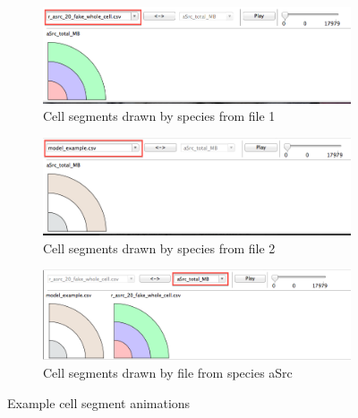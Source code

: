 \begin{figure}[h!]
    \centering
    \begin{subfigure}[b]{0.9\textwidth}
        \centering
        \includegraphics[width=\textwidth]{images/by_file_fake.png}
        \caption{Cell segments drawn by species from file 1}
        \label{fig:cell_seg_file_fake}
    \end{subfigure}

    \begin{subfigure}[b]{0.9\textwidth}
        \centering
        \includegraphics[width=\textwidth]{images/by_file_model.png}
        \caption{Cell segments drawn by species from file 2}
        \label{fig:cell_seg_file_model}
    \end{subfigure}

    \begin{subfigure}[b]{0.9\textwidth}
        \centering
        \includegraphics[width=\textwidth]{images/by_species_asrc.png}
        \caption{Cell segments drawn by file from species aSrc}
        \label{fig:cell_seg_species}
    \end{subfigure}

    \caption{Example cell segment animations}
    \label{fig:cell_segments}
\end{figure}

